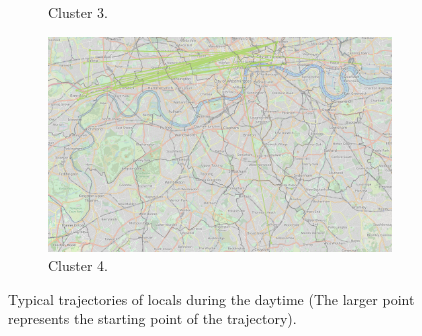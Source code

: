 \documentclass{article}
\theoremstyle{definition}
\theoremstyle{remark}
\begin{document}
\begin{figure}[!h]
\begin{subfigure}{0.6\textheight}
\caption{Cluster 3.}
\label{fig:daytime_locals_c3}
\end{subfigure}
\begin{subfigure}{0.6\textheight}
\centering
\includegraphics[width=0.4\linewidth]{figures/daytime_locals_c4.png}
\caption{Cluster 4.}
\label{fig:daytime_locals_c4}
\end{subfigure}

\caption{Typical trajectories of locals during the daytime (The larger point represents the starting point of the trajectory).}
\label{fig:sequences_daytime_locals}
\end{figure}
\end{document}
